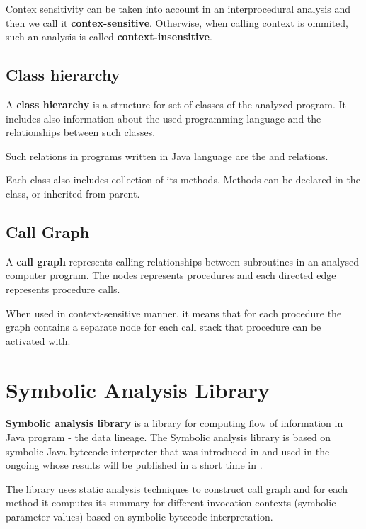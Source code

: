 Contex sensitivity can be taken into account in an interprocedural analysis and
then we call it \textbf{contex-sensitive}. Otherwise, when calling context is ommited,
such an analysis is called \textbf{context-insensitive}.




\subsection{Class hierarchy}

A \textbf{class hierarchy} is a structure for set of classes
of the analyzed program. It includes also information about the used
programming language and the relationships between such classes.

Such relations in programs written in Java language are the  and 
relations.

Each class also includes collection of its methods. Methods can be declared in the
class, or inherited from parent.



\subsection{Call Graph}

A \textbf{call graph} represents calling relationships between subroutines
in an analysed computer program. The nodes represents procedures and each
directed edge represents procedure calls.

When used in context-sensitive manner, it means that for each procedure 
the graph contains a separate node for each call stack that procedure can be
activated with.




\section{Symbolic Analysis Library \label{chapter:analysis:symbolicAnalysisLibrary}}

\textbf{Symbolic analysis library} is a library for computing flow of information
in Java program - the data lineage.
The Symbolic analysis library is based on symbolic Java bytecode interpreter
that was introduced in \citet{ParizekHybridAnalysis}
and used in the ongoing whose results will be published
in a short time in \citet{ParizekBUBEN}.

The library uses static analysis techniques to construct call graph and
for each method it computes its summary for different invocation contexts (symbolic parameter values)
based on symbolic bytecode interpretation.

